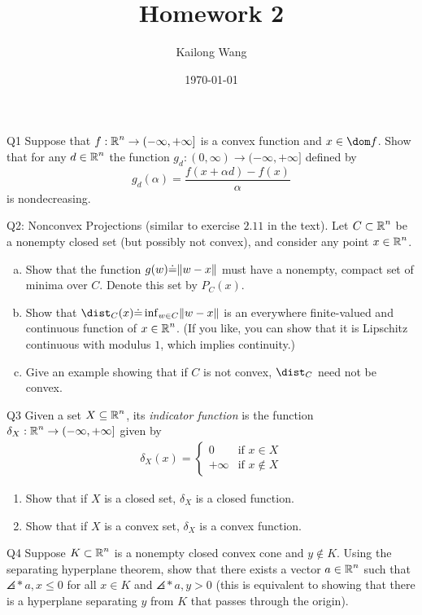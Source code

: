 \documentclass{article}
\title{Homework 2}
\author{Kailong Wang}
\date{\today}
\begin{document}
\maketitle

\begin{problem}
    {Q1}
    Suppose that $f:\operatorname{\mathbb{R}}^n\rightarrow(-\infty, +\infty]$ is a convex function and $x \in \dom f$. Show that for any $d\in\operatorname{\mathbb{R}}^n$ the function $g_d:(0,\infty)\rightarrow(-\infty,+\infty]$ defined by
    \[
        g_d(\alpha) = \frac{f(x+\alpha d)-f(x)}{\alpha}
    \]
    is nondecreasing.
\end{problem}

\begin{problem}
    {Q2: Nonconvex Projections (similar to exercise $2.11$ in the text).}
    Let $C\subset\operatorname{\mathbb{R}}^n$ be a nonempty closed set (but possibly not convex), and consider any point $x\in\operatorname{\mathbb{R}}^n$.
    \begin{enumerate}[(a)]
        \item Show that the function $g(w)\dot{=}\lVert w-x\rVert$ must have a nonempty, compact set of minima over $C$. Denote this set by $P_C(x)$.
        \item Show that $\dist_C(x)\dot{=}\inf_{w\in C}\norm{w-x}$ is an everywhere finite-valued and continuous function of $x\in\operatorname{\mathbb{R}}^n$. (If you like, you can show that it is Lipschitz continuous with modulus $1$, which implies continuity.)
        \item Give an example showing that if $C$ is not convex, $\dist_C$ need not be convex.
    \end{enumerate}
\end{problem}

\begin{problem}
    {Q3}
    Given a set $X\subseteq\operatorname{\mathbb{R}}^n$, its \textit{indicator function} is the function $\delta_X:\operatorname{\mathbb{R}}^n\rightarrow(-\infty, +\infty]$ given by
    \begin{align*}
        \delta_X(x) = \begin{cases}
            0 & \text{if } x\in X\\
            +\infty & \text{if } x\notin X
        \end{cases}
    \end{align*}
    \begin{enumerate}
        \item Show that if $X$ is a closed set, $\delta_X$ is a closed function.
        \item Show that if $X$ is a convex set, $\delta_X$ is a convex function.
    \end{enumerate}
\end{problem}

\begin{problem}
    {Q4}
    Suppose $K\subset\operatorname{\mathbb{R}}^n$ is a nonempty closed convex cone and $y\notin K$. Using the separating hyperplane theorem, show that there exists a vector $a\in \operatorname{\mathbb{R}}^n$ such that $\angles*{a,x}\leq 0$ for all $x\in K$ and $\angles*{a,y}>0$ (this is equivalent to showing that there is a hyperplane separating $y$ from $K$ that passes through the origin).
\end{problem}
\end{document}
